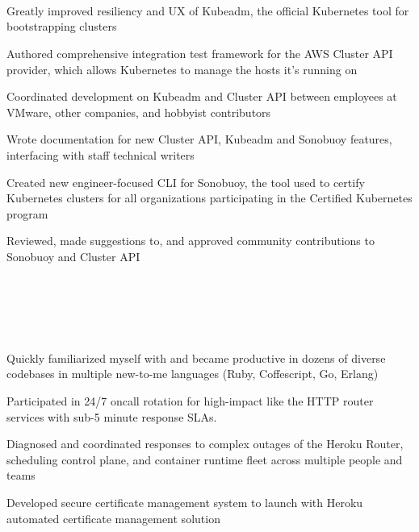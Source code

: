 \documentclass[letterpaper,11pt,notitlepage]{article}
\begin{document}

\vbar
{}
         \\
         \\
         \\
        \begin{employment}
          \item Greatly improved resiliency and UX of Kubeadm, the official Kubernetes tool
            for bootstrapping clusters
          \item Authored comprehensive integration test framework for the
            AWS Cluster API provider, which allows Kubernetes to manage the hosts it's running on
          \item Coordinated development on Kubeadm and Cluster API between
            employees at VMware, other companies, and hobbyist contributors
          \item Wrote documentation for new Cluster API, Kubeadm and Sonobuoy
            features, interfacing with staff technical writers
          \item Created new engineer-focused CLI for Sonobuoy, the tool used to certify Kubernetes clusters
                for all organizations participating in the Certified Kubernetes program
          \item Reviewed, made suggestions to, and approved community contributions to Sonobuoy and Cluster API
        \end{employment}
         \\
         \\
         \\
         \\
        \begin{employment}
            \item Quickly familiarized myself with and became productive in
              dozens of diverse codebases in multiple new-to-me languages (Ruby,
              Coffescript, Go, Erlang)
            \item Participated in 24/7 oncall rotation for high-impact like the HTTP router
              services with sub-5 minute response SLAs.
            \item Diagnosed and coordinated responses to complex outages of the
              Heroku Router, scheduling control plane, and container runtime
              fleet across multiple people and teams
            \item Developed secure certificate management system to launch with
              Heroku automated certificate management solution
        \end{employment}
\end{document}
